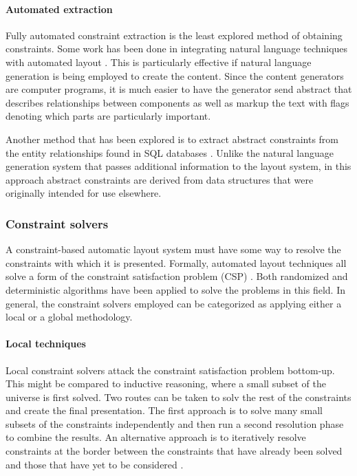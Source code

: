      \paragraph{Automated extraction}

      Fully automated constraint extraction is the least explored method of
      obtaining constraints. Some work has been done in integrating natural
      language techniques with automated layout \citep{roth-2}. This is
      particularly effective if natural language generation is being employed to
      create the content. Since the content generators are computer programs, it
      is much easier to have the generator send abstract that describes
      relationships between components as well as markup the text with flags
      denoting which parts are particularly important.

      Another method that has been explored is to extract abstract constraints
      from the entity relationships found in SQL databases \citep{pizano-1}.
      Unlike the natural language generation system that passes additional
      information to the layout system, in this approach abstract constraints are
      derived from data structures that were originally intended for use
      elsewhere.

    \subsubsection{Constraint solvers}

     A constraint-based automatic layout system must have some way to resolve
     the constraints with which it is presented. Formally, automated layout
     techniques all solve a form of the constraint satisfaction problem (CSP)
     \citep{mackworth-2,mackworth-1}. Both randomized and deterministic
     algorithms have been applied to solve the problems in this field. In
     general, the constraint solvers employed can be categorized as applying
     either a local or a global methodology.

     \paragraph{Local techniques}

      Local constraint solvers attack the constraint satisfaction problem
      bottom-up. This might be compared to inductive reasoning, where a small
      subset of the universe is first solved. Two routes can be taken to solv the
      rest of the constraints and create the final presentation. The first
      approach is to solve many small subsets of the constraints independently
      and then run a second resolution phase to combine the results. An
      alternative approach is to iteratively resolve constraints at the border
      between the constraints that have already been solved and those that have
      yet to be considered \citep{nilsson-1}.

